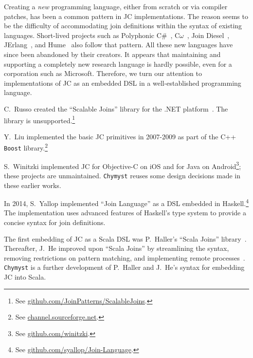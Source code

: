 \documentclass[sigplan,10pt]{acmart}\settopmatter{}
\begin{document}
Creating a \emph{new} programming language, either from scratch or
via compiler patches, has been a common pattern in JC implementations.
The reason seems to be the difficulty of accommodating join definitions
within the syntax of existing languages. Short-lived projects such
as Polyphonic C\#~\citep{BenFou2002}, C$\omega$~\citep{Rus2007},
Join Diesel~\citep{Ose2005}, JErlang~\citep{PloEis2009}, and Hume~\citep{HamEA2006}
also follow that pattern. All these new languages have since been
abandoned by their creators. It appears that maintaining and supporting
a completely new research language is hardly possible, even for a
corporation such as Microsoft. Therefore, we turn our attention to
implementations of JC as an embedded DSL in a well-established programming
language. 

C.~Russo created the ``Scalable Joins'' library for the .NET platform~\citep{Rus2007}.
The library is unsupported.\footnote{ See \href{https://github.com/JoinPatterns/ScalableJoins}{github.com/JoinPatterns/ScalableJoins}.}

\begin{comment}
(This is not actually JC but CSP!) In 2009, F.~Peschanski published
a JC library for the Lua language, called ``LuaPi''. The library
appears to be unsupported.\footnote{ See \href{https://github.com/fredokun/LuaPi}{github.com/fredokun/LuaPi}.}
\end{comment}

Y.~Liu implemented the basic JC primitives in 2007-2009 as part of
the C++ \texttt{Boost} library.\footnote{ See \href{http://channel.sourceforge.net/}{channel.sourceforge.net}.} 

S.~Winitzki implemented JC for
Objective-C on iOS and for Java on Android\footnote{ See \href{https://github.com/winitzki}{github.com/winitzki}.};
these projects are unmaintained. \texttt{Chymyst}
reuses some design decisions made in these earlier works.

In 2014, S.~Yallop implemented ``Join Language'' as a DSL embedded
in Haskell.\footnote{ See \href{https://github.com/syallop/Join-Language}{github.com/syallop/Join-Language}.}
The implementation uses advanced features of Haskell's type system
to provide a concise syntax for join definitions.

The first embedding of JC as a Scala DSL was P.~Haller's ``Scala
Joins'' library~\citep{HalCut2008}. Thereafter, J.~He improved
upon ``Scala Joins'' by streamlining the syntax, removing restrictions
on pattern matching, and implementing remote processes~\citep{He2014}.
\texttt{Chymyst} is a further development of P.~Haller and J.~He's
syntax for embedding JC into Scala.
\end{document}
